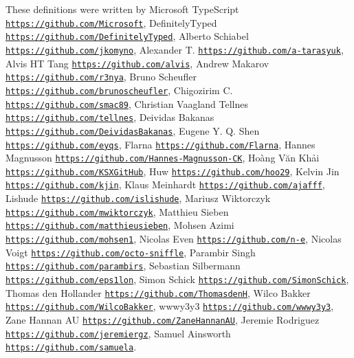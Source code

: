 These definitions were written by Microsoft Type\+Script \href{https://github.com/Microsoft}{\tt https\+://github.\+com/\+Microsoft}, Definitely\+Typed \href{https://github.com/DefinitelyTyped}{\tt https\+://github.\+com/\+Definitely\+Typed}, Alberto Schiabel \href{https://github.com/jkomyno}{\tt https\+://github.\+com/jkomyno}, Alexander T. \href{https://github.com/a-tarasyuk}{\tt https\+://github.\+com/a-\/tarasyuk}, Alvis HT Tang \href{https://github.com/alvis}{\tt https\+://github.\+com/alvis}, Andrew Makarov \href{https://github.com/r3nya}{\tt https\+://github.\+com/r3nya}, Bruno Scheufler \href{https://github.com/brunoscheufler}{\tt https\+://github.\+com/brunoscheufler}, Chigozirim C. \href{https://github.com/smac89}{\tt https\+://github.\+com/smac89}, Christian Vaagland Tellnes \href{https://github.com/tellnes}{\tt https\+://github.\+com/tellnes}, Deividas Bakanas \href{https://github.com/DeividasBakanas}{\tt https\+://github.\+com/\+Deividas\+Bakanas}, Eugene Y. Q. Shen \href{https://github.com/eyqs}{\tt https\+://github.\+com/eyqs}, Flarna \href{https://github.com/Flarna}{\tt https\+://github.\+com/\+Flarna}, Hannes Magnusson \href{https://github.com/Hannes-Magnusson-CK}{\tt https\+://github.\+com/\+Hannes-\/\+Magnusson-\/\+CK}, Hoàng Văn Khải \href{https://github.com/KSXGitHub}{\tt https\+://github.\+com/\+K\+S\+X\+Git\+Hub}, Huw \href{https://github.com/hoo29}{\tt https\+://github.\+com/hoo29}, Kelvin Jin \href{https://github.com/kjin}{\tt https\+://github.\+com/kjin}, Klaus Meinhardt \href{https://github.com/ajafff}{\tt https\+://github.\+com/ajafff}, Lishude \href{https://github.com/islishude}{\tt https\+://github.\+com/islishude}, Mariusz Wiktorczyk \href{https://github.com/mwiktorczyk}{\tt https\+://github.\+com/mwiktorczyk}, Matthieu Sieben \href{https://github.com/matthieusieben}{\tt https\+://github.\+com/matthieusieben}, Mohsen Azimi \href{https://github.com/mohsen1}{\tt https\+://github.\+com/mohsen1}, Nicolas Even \href{https://github.com/n-e}{\tt https\+://github.\+com/n-\/e}, Nicolas Voigt \href{https://github.com/octo-sniffle}{\tt https\+://github.\+com/octo-\/sniffle}, Parambir Singh \href{https://github.com/parambirs}{\tt https\+://github.\+com/parambirs}, Sebastian Silbermann \href{https://github.com/eps1lon}{\tt https\+://github.\+com/eps1lon}, Simon Schick \href{https://github.com/SimonSchick}{\tt https\+://github.\+com/\+Simon\+Schick}, Thomas den Hollander \href{https://github.com/ThomasdenH}{\tt https\+://github.\+com/\+ThomasdenH}, Wilco Bakker \href{https://github.com/WilcoBakker}{\tt https\+://github.\+com/\+Wilco\+Bakker}, wwwy3y3 \href{https://github.com/wwwy3y3}{\tt https\+://github.\+com/wwwy3y3}, Zane Hannan AU \href{https://github.com/ZaneHannanAU}{\tt https\+://github.\+com/\+Zane\+Hannan\+AU}, Jeremie Rodriguez \href{https://github.com/jeremiergz}{\tt https\+://github.\+com/jeremiergz}, Samuel Ainsworth \href{https://github.com/samuela}{\tt https\+://github.\+com/samuela}. 